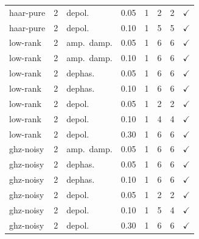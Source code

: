 \documentclass[a4paper,superscriptaddress,nofootinbib,onecolumn,nopdfoutputerror]{quantumarticle}
\begin{document}
\begin{center}
\begin{longtable}{@{}llllrrrc@{}}
haar-pure & 2 & depol. & 0.05 & 1 & 2 & 2 & $\checkmark$ \\
haar-pure & 2 & depol. & 0.10 & 1 & 5 & 5 & $\checkmark$ \\
low-rank & 2 & amp.\ damp. & 0.05 & 1 & 6 & 6 & $\checkmark$ \\
low-rank & 2 & amp.\ damp. & 0.10 & 1 & 6 & 6 & $\checkmark$ \\
low-rank & 2 & dephas. & 0.05 & 1 & 6 & 6 & $\checkmark$ \\
low-rank & 2 & dephas. & 0.10 & 1 & 6 & 6 & $\checkmark$ \\
low-rank & 2 & depol. & 0.05 & 1 & 2 & 2 & $\checkmark$ \\
low-rank & 2 & depol. & 0.10 & 1 & 4 & 4 & $\checkmark$ \\
low-rank & 2 & depol. & 0.30 & 1 & 6 & 6 & $\checkmark$ \\
ghz-noisy & 2 & amp.\ damp. & 0.05 & 1 & 6 & 6 & $\checkmark$ \\
ghz-noisy & 2 & dephas. & 0.05 & 1 & 6 & 6 & $\checkmark$ \\
ghz-noisy & 2 & dephas. & 0.10 & 1 & 6 & 6 & $\checkmark$ \\
ghz-noisy & 2 & depol. & 0.05 & 1 & 2 & 2 & $\checkmark$ \\
ghz-noisy & 2 & depol. & 0.10 & 1 & 5 & 4 & $\checkmark$ \\
ghz-noisy & 2 & depol. & 0.30 & 1 & 6 & 6 & $\checkmark$ \\
\bottomrule
\end{longtable}
\end{center}
\end{document}
